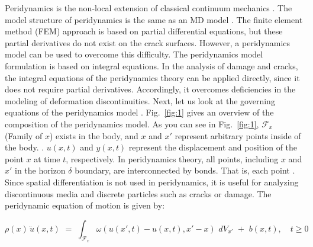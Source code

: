 Peridynamics is the non-local extension of classical continuum mechanics \cite{Ref15}. The model structure of peridynamics is the same as an MD model {}.
The finite element method (FEM) approach is based on partial differential equations, but these partial derivatives do not exist on the crack surfaces.
However, a peridynamics model can be used to overcome this difficulty.
The peridynamics model formulation is based on integral equations.
In the analysis of damage and cracks, the integral equations of the peridynamics theory can be applied directly, since it does not require partial derivatives.
Accordingly, it overcomes deficiencies in the modeling of deformation discontinuities.
Next, let us look at the governing equations of the peridynamics model \cite{Ref2,Ref3,Ref4}.
Fig.~\ref{fig:1} gives an overview of the composition of the peridynamics model.
As you can see in Fig.~\ref{fig:1}, $\mathcal{F}_x$ (Family of $x$) exists in the body, and  $x$ and ${x'}$ represent arbitrary points inside of the body. %
{}.
$u(x,t)$ and $y(x,t)$ represent the displacement and position of the point $x$ at time $t$, respectively.
In peridynamics theory, all points, including $x$ and ${x'}$ in the horizon $\delta$ boundary, are interconnected by bonds.
That is, each point {}.
{}
{}
Since spatial differentiation is not used in peridynamics, it is useful for analyzing discontinuous media and discrete particles such as cracks or damage.
The peridynamic equation of motion is given by:

\begin{equation}
\rho(x) \, \ddot{u}(x,t) \, \, = \, \, \int_{\mathcal{F}_x} \omega\left(u(x',t)-u(x,t),x'-x\right) \, \, dV_{x'} \, \, + \, \, b(x,t), \quad t\geq0
\end{equation}

